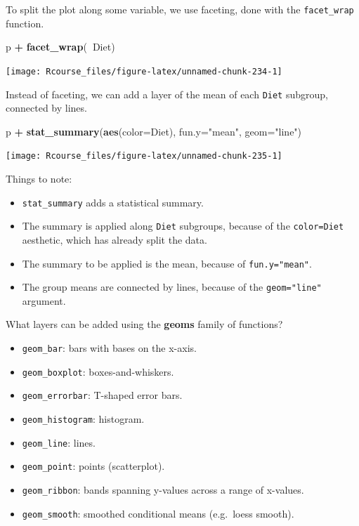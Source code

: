\documentclass[]{book}
\newenvironment{Shaded}{\begin{snugshade}}{\end{snugshade}}
\newcommand{\KeywordTok}[1]{\textcolor[rgb]{0.13,0.29,0.53}{\textbf{#1}}}
\newcommand{\DataTypeTok}[1]{\textcolor[rgb]{0.13,0.29,0.53}{#1}}
\newcommand{\StringTok}[1]{\textcolor[rgb]{0.31,0.60,0.02}{#1}}
\newcommand{\OperatorTok}[1]{\textcolor[rgb]{0.81,0.36,0.00}{\textbf{#1}}}
\newcommand{\NormalTok}[1]{#1}
\providecommand{\tightlist}{%
  \setlength{\itemsep}{0pt}\setlength{\parskip}{0pt}}
\theoremstyle{definition}
\theoremstyle{definition}
\theoremstyle{definition}
\theoremstyle{remark}
\begin{document}
To split the plot along some variable, we use faceting, done with the
\texttt{facet\_wrap} function.

\begin{Shaded}
\begin{Highlighting}[]
\NormalTok{p }\OperatorTok{+}\StringTok{ }\KeywordTok{facet_wrap}\NormalTok{(}\OperatorTok{~}\NormalTok{Diet)}
\end{Highlighting}
\end{Shaded}

\texttt{[image: Rcourse\_files/figure-latex/unnamed-chunk-234-1]}

Instead of faceting, we can add a layer of the mean of each
\texttt{Diet} subgroup, connected by lines.

\begin{Shaded}
\begin{Highlighting}[]
\NormalTok{p }\OperatorTok{+}\StringTok{ }\KeywordTok{stat_summary}\NormalTok{(}\KeywordTok{aes}\NormalTok{(}\DataTypeTok{color=}\NormalTok{Diet), }\DataTypeTok{fun.y=}\StringTok{"mean"}\NormalTok{, }\DataTypeTok{geom=}\StringTok{"line"}\NormalTok{)}
\end{Highlighting}
\end{Shaded}

\texttt{[image: Rcourse\_files/figure-latex/unnamed-chunk-235-1]}

Things to note:

\begin{itemize}
\tightlist
\item
  \texttt{stat\_summary} adds a statistical summary.
\item
  The summary is applied along \texttt{Diet} subgroups, because of the
  \texttt{color=Diet} aesthetic, which has already split the data.
\item
  The summary to be applied is the mean, because of
  \texttt{fun.y="mean"}.
\item
  The group means are connected by lines, because of the
  \texttt{geom="line"} argument.
\end{itemize}

What layers can be added using the \textbf{geoms} family of functions?

\begin{itemize}
\tightlist
\item
  \texttt{geom\_bar}: bars with bases on the x-axis.
\item
  \texttt{geom\_boxplot}: boxes-and-whiskers.
\item
  \texttt{geom\_errorbar}: T-shaped error bars.
\item
  \texttt{geom\_histogram}: histogram.
\item
  \texttt{geom\_line}: lines.
\item
  \texttt{geom\_point}: points (scatterplot).
\item
  \texttt{geom\_ribbon}: bands spanning y-values across a range of
  x-values.
\item
  \texttt{geom\_smooth}: smoothed conditional means (e.g.~loess smooth).
\end{itemize}
\end{document}
